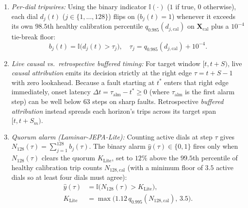 \documentclass[journal]{IEEEtran}
\begin{document}
\begin{enumerate}[leftmargin=*,nosep,itemsep=1pt]
    \item \emph{Per-dial tripwires:} Using the binary indicator $\mathbb{I}(\cdot)$ ($1$ if true, $0$ otherwise), each dial $d_j(t)$ ($j \in \{1,\dots,128\}$) flips on ($b_j(t)=1$) whenever it exceeds its own $98.5$th healthy calibration percentile $q_{0.985}(d_{j,\text{cal}})$ on $\mathbf{X}_{\text{cal}}$ plus a $10^{-4}$ tie-break floor:
    \begin{equation}
        b_j(t) = \mathbb{I}\bigl(d_j(t) > \tau_j\bigr), \quad \tau_j = q_{0.985}(d_{j,\text{cal}}) + 10^{-4}.
        \label{eq:dial_tripwire}
    \end{equation}
    \item \emph{Live causal vs.\ retrospective buffered timing:} For target window $[t, t+S)$, live \emph{causal attribution} emits its decision strictly at the right edge $\tau = t+S-1$ with zero lookahead. Because a fault starting at $t^*$ enters that right edge immediately, onset latency $\Delta t = \tau_{\text{alm}} - t^* \ge 0$ (where $\tau_{\text{alm}}$ is the first alarm step) can be well below $63$ steps on sharp faults. Retrospective \emph{buffered attribution} instead spreads each horizon's trips across its target span $[t, t+S_m)$.
    \item \emph{Quorum alarm (\emph{Laminar-JEPA-Lite}):} Counting active dials at step $\tau$ gives $N_{128}(\tau) = \sum_{j=1}^{128} b_j(\tau)$. The binary alarm $\hat{y}(\tau)\in\{0,1\}$ fires only when $N_{128}(\tau)$ clears the quorum $K_{\text{Lite}}$, set to $12\%$ above the $99.5$th percentile of healthy calibration trip counts $N_{128,\text{cal}}$ (with a minimum floor of $3.5$ active dials so at least four dials must agree):
    \begin{equation}
    \begin{aligned}
        \hat{y}(\tau) &= \mathbb{I}\bigl(N_{128}(\tau) > K_{\text{Lite}}\bigr), \\
        K_{\text{Lite}} &= \max\bigl(1.12\,q_{0.995}(N_{128,\text{cal}}),\,3.5\bigr).
    \end{aligned}
        \label{eq:panel_quorum}
    \end{equation}
\end{enumerate}
\end{document}
